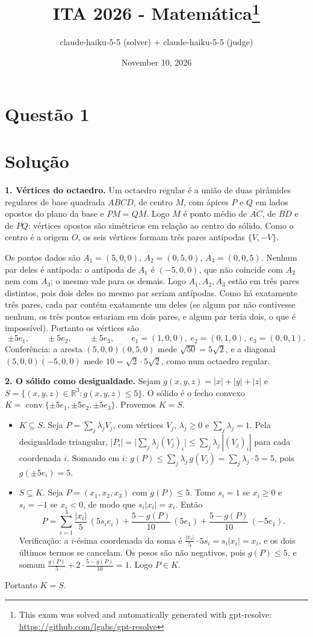 \documentclass{article}%
\title{ITA 2026 - Matemática\thanks{This exam was solved and automatically generated with gpt-resolve: \url{https://github.com/lgabs/gpt-resolve}}}%
\author{claude{-}haiku{-}5{-}5 (solver) + claude{-}haiku{-}5{-}5 (judge)}%
\date{November 10, 2026}%
\begin{document}
%
\normalsize%
\maketitle%
\section*{Questão 1}

\section*{Solução}

\textbf{1. Vértices do octaedro.} Um octaedro regular é a união de duas pirâmides regulares de base quadrada $ABCD$, de centro $M$, com ápices $P$ e $Q$ em lados opostos do plano da base e $PM=QM$. Logo $M$ é ponto médio de $\overline{AC}$, de $\overline{BD}$ e de $\overline{PQ}$: vértices opostos são simétricos em relação ao centro do sólido. Como o centro é a origem $O$, os seis vértices formam três pares antípodas $\{V,-V\}$.

Os pontos dados são $A_1=(5,0,0)$, $A_2=(0,5,0)$, $A_3=(0,0,5)$. Nenhum par deles é antípoda: o antípoda de $A_1$ é $(-5,0,0)$, que não coincide com $A_2$ nem com $A_3$; o mesmo vale para os demais. Logo $A_1,A_2,A_3$ estão em três pares distintos, pois dois deles no mesmo par seriam antípodas. Como há exatamente três pares, cada par contém exatamente um deles (se algum par não contivesse nenhum, os três pontos estariam em dois pares, e algum par teria dois, o que é impossível). Portanto os vértices são
\[
\pm 5e_1,\qquad \pm 5e_2,\qquad \pm 5e_3,\qquad e_1=(1,0,0),\ e_2=(0,1,0),\ e_3=(0,0,1).
\]
Conferência: a aresta $\overline{(5,0,0)(0,5,0)}$ mede $\sqrt{50}=5\sqrt2$, e a diagonal $\overline{(5,0,0)(-5,0,0)}$ mede $10=\sqrt2\cdot 5\sqrt2$, como num octaedro regular.

\textbf{2. O sólido como desigualdade.} Sejam $g(x,y,z)=|x|+|y|+|z|$ e $S=\{(x,y,z)\in\mathbb{R}^3 : g(x,y,z)\le 5\}$. O sólido é o fecho convexo $K=\operatorname{conv}\{\pm5e_1,\pm5e_2,\pm5e_3\}$. Provemos $K=S$.
\begin{itemize}
\item[(i)] $K\subseteq S$. Seja $P=\sum_j\lambda_jV_j$, com vértices $V_j$, $\lambda_j\ge 0$ e $\sum_j\lambda_j=1$. Pela desigualdade triangular, $|P_i|=\bigl|\sum_j\lambda_j(V_j)_i\bigr|\le\sum_j\lambda_j\,|(V_j)_i|$ para cada coordenada $i$. Somando em $i$: $g(P)\le\sum_j\lambda_j\,g(V_j)=\sum_j\lambda_j\cdot 5=5$, pois $g(\pm5e_i)=5$.
\item[(ii)] $S\subseteq K$. Seja $P=(x_1,x_2,x_3)$ com $g(P)\le 5$. Tome $s_i=1$ se $x_i\ge 0$ e $s_i=-1$ se $x_i<0$, de modo que $s_i|x_i|=x_i$. Então
\[
P=\sum_{i=1}^{3}\frac{|x_i|}{5}\,(5s_ie_i)+\frac{5-g(P)}{10}\,(5e_1)+\frac{5-g(P)}{10}\,(-5e_1).
\]
Verificação: a $i$-ésima coordenada da soma é $\frac{|x_i|}{5}\cdot 5s_i=s_i|x_i|=x_i$, e os dois últimos termos se cancelam. Os pesos são não negativos, pois $g(P)\le 5$, e somam $\frac{g(P)}{5}+2\cdot\frac{5-g(P)}{10}=1$. Logo $P\in K$.
\end{itemize}
Portanto $K=S$.
\end{document}

